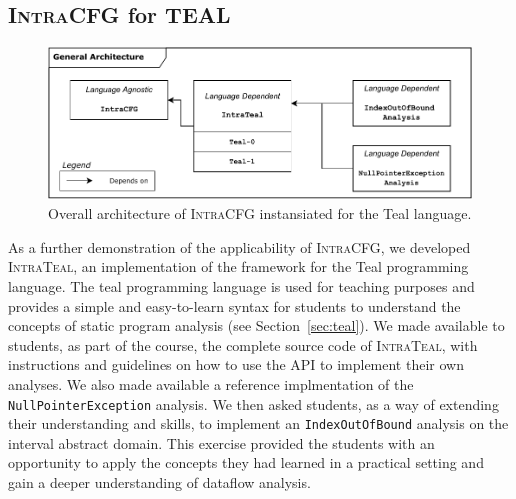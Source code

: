 \subsection{\textsc{IntraCFG} for TEAL}
\begin{figure}[H]
    \centering
    \includegraphics[scale=0.65]{kappa/img/architectureteal.pdf}
    \caption{\label{fig:IntraTeal} Overall architecture of \textsc{IntraCFG} instansiated for the Teal language.}
\end{figure}
As a further demonstration of the applicability of \textsc{IntraCFG},
we developed \textsc{IntraTeal}, an implementation of the framework for the Teal programming language.
The teal programming language is used for teaching purposes 
and provides a simple and easy-to-learn syntax for students to understand the 
concepts of static program analysis (see Section~\ref{sec:teal}).
We made available to students, as part of the course, the complete source code of \textsc{IntraTeal}, 
with instructions and guidelines on how to use the API to implement their own analyses.
We also made available a reference implmentation of the 
\texttt{NullPointerException} analysis. We then asked students, as a way of 
extending their understanding and skills, to implement an \texttt{IndexOutOfBound} 
analysis on the interval abstract domain. This exercise provided the 
students with an opportunity to apply the concepts they had learned in a practical 
setting and gain a deeper understanding of dataflow analysis.


